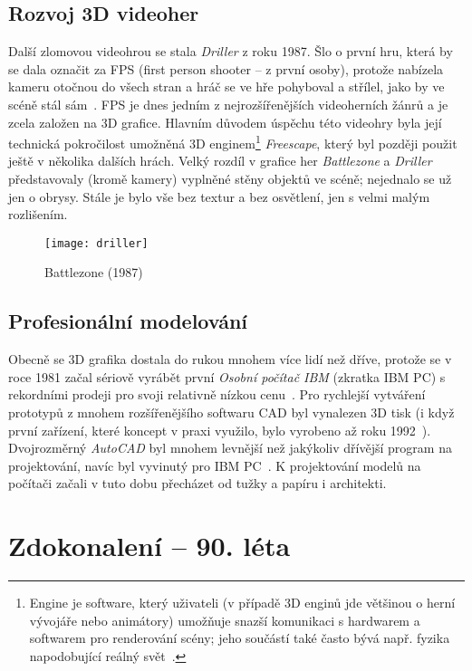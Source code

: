 \documentclass[a4paper, 11pt]{report}
\begin{document}
\begin{chapterwithoutpagebreak}
\section{Rozvoj 3D videoher}
Další zlomovou videohrou se stala  \emph{Driller} z roku 1987. Šlo o první hru, která by se dala označit za FPS (first person shooter --  z první osoby), protože nabízela kameru otočnou do všech stran a hráč se ve hře pohyboval a střílel, jako by ve scéně stál sám~\cite{wiki:driller}. FPS je dnes jedním z nejrozšířenějších videoherních žánrů a je zcela založen na 3D grafice. Hlavním důvodem úspěchu této videohry byla její technická pokročilost umožněná 3D enginem\footnote{Engine je software, který uživateli (v případě 3D enginů jde většinou o herní vývojáře nebo animátory) umožňuje snazší komunikaci s hardwarem a softwarem pro renderování scény; jeho součástí také často bývá např. fyzika napodobující reálný svět~\cite{techjunkie:engine}.} \emph{Freescape}, který byl později použit ještě v několika dalších hrách. Velký rozdíl v grafice her \emph{Battlezone} a \emph{Driller} představovaly (kromě kamery) vyplněné stěny objektů ve scéně; nejednalo se už jen o obrysy. Stále je bylo vše bez textur a bez osvětlení, jen s velmi malým rozlišením.

\begin{figure}[H]
    \centering
    \texttt{[image: driller]}
    \caption[Driller (1987)]{Battlezone (1987)~\cite{pic:driller}}
\end{figure}

\section{Profesionální modelování}
Obecně se 3D grafika dostala do rukou mnohem více lidí než dříve, protože se v roce 1981 začal sériově vyrábět první \emph{Osobní počítač IBM} (zkratka IBM PC) s rekordními prodeji pro svoji relativně nízkou cenu~\cite{ibm:pc}. Pro rychlejší vytváření prototypů z mnohem rozšířenějšího softwaru CAD byl vynalezen 3D tisk (i když první zařízení, které koncept v praxi využilo, bylo vyrobeno až roku 1992~\cite{bcn3d:invention}). Dvojrozměrný \emph{AutoCAD} byl mnohem levnější než jakýkoliv dřívější program na projektování, navíc byl vyvinutý pro IBM PC~\cite{cadstudio:history}. K projektování modelů na počítači začali v tuto dobu přecházet od tužky a papíru i architekti.

\chapter{Zdokonalení -- 90. léta}

\end{chapterwithoutpagebreak}
\end{document}
